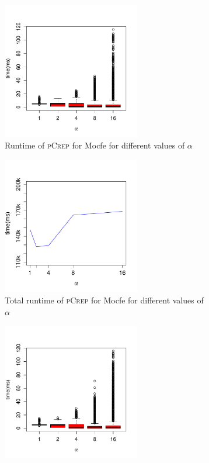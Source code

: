 \documentclass[a4paper,UKenglish,cleveref, autoref, thm-restate,authorcolumns]{lipics-v2019}
\newcommand{\adjDel}{\textsc{pCrep}}
\newcommand{\dbmocfe}{Mocfe}
\begin{document}
\label{sec:alpha_influence}
\begin{figure}[h]
	\begin{minipage}{0.48\linewidth}
		\begin{subfigure}{\linewidth}
			\includegraphics[height=6cm]{plots/boxplot_varying_alphas_mocfe_decompTree}
			\caption{Runtime of \adjDel{} for \dbmocfe{} for different values of $\alpha$}
		\end{subfigure}				
	\end{minipage}
\begin{minipage}{0.48\linewidth}
	\begin{subfigure}{\linewidth}
		\includegraphics*[height=6cm]{plots/plot_varying_alphas_mocfe}
		\caption{Total runtime of \adjDel{} for \dbmocfe{} for different values of $\alpha$}
	\end{subfigure}
\end{minipage}
	\begin{minipage}{0.48\linewidth}
		\begin{subfigure}{\linewidth}
			\includegraphics[height=6cm]{plots/boxplot_varying_alphas_mocfe_coreDel}

\end{subfigure}
\end{minipage}
\end{figure}
\end{document}
